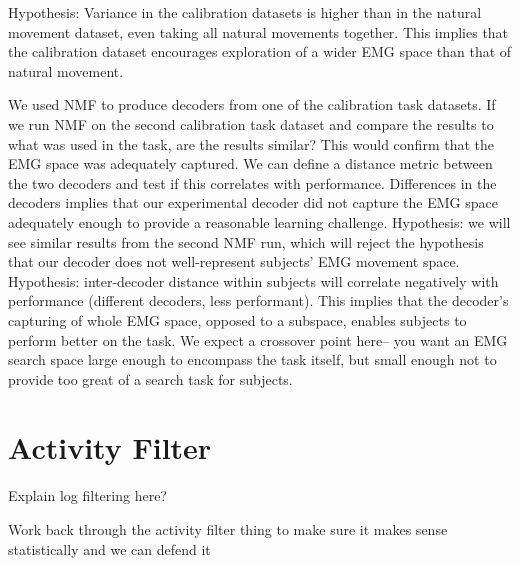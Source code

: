 \documentclass[../main.tex]{subfiles}
\begin{document}
Hypothesis: Variance in the calibration datasets is higher than in the natural movement dataset, even taking all natural movements together. This implies that the calibration dataset encourages exploration of a wider EMG space than that of natural movement.

We used NMF to produce decoders from one of the calibration task datasets. If we run NMF on the second calibration task dataset and compare the results to what was used in the task, are the results similar? This would confirm that the EMG space was adequately captured. We can define a distance metric between the two decoders and test if this correlates with performance. Differences in the decoders implies that our experimental decoder did not capture the EMG space adequately enough to provide a reasonable learning challenge.
Hypothesis: we will see similar results from the second NMF run, which will reject the hypothesis that our decoder does not well-represent subjects’ EMG movement space.
Hypothesis: inter-decoder distance within subjects will correlate negatively with performance (different decoders, less performant). This implies that the decoder’s capturing of whole EMG space, opposed to a subspace, enables subjects to perform better on the task. We expect a crossover point here– you want an EMG search space large enough to encompass the task itself, but small enough not to provide too great of a search task for subjects.





\section{Activity Filter}


Explain log filtering here?


Work back through the activity filter thing to make sure it makes sense statistically and we can defend it
\end{document}
